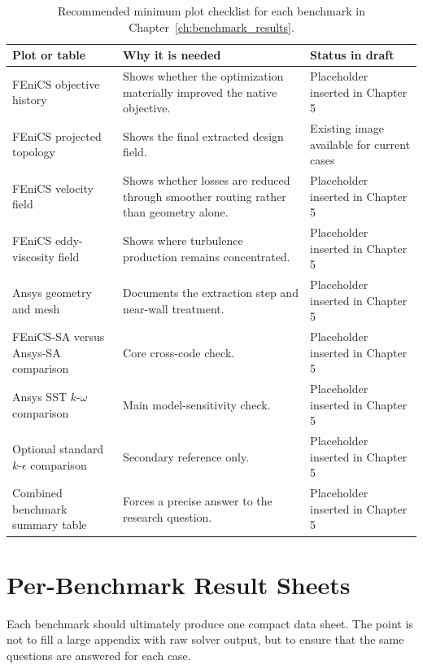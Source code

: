 \begin{table}[htbp]
	\centering
	\footnotesize
	\caption{Recommended minimum plot checklist for each benchmark in Chapter~\ref{ch:benchmark_results}.}
	\label{tab:app_plot_checklist}
	\renewcommand{\arraystretch}{1.2}
	\begin{tabularx}{\textwidth}{l X X}
		\hline
		\textbf{Plot or table} & \textbf{Why it is needed} & \textbf{Status in draft} \\
		\hline
		FEniCS objective history & Shows whether the optimization materially improved the native objective. & Placeholder inserted in Chapter 5 \\
		FEniCS projected topology & Shows the final extracted design field. & Existing image available for current cases \\
		FEniCS velocity field & Shows whether losses are reduced through smoother routing rather than geometry alone. & Placeholder inserted in Chapter 5 \\
		FEniCS eddy-viscosity field & Shows where turbulence production remains concentrated. & Placeholder inserted in Chapter 5 \\
		Ansys geometry and mesh & Documents the extraction step and near-wall treatment. & Placeholder inserted in Chapter 5 \\
		FEniCS-SA versus Ansys-SA comparison & Core cross-code check. & Placeholder inserted in Chapter 5 \\
		Ansys SST $k$-$\omega$ comparison & Main model-sensitivity check. & Placeholder inserted in Chapter 5 \\
		Optional standard $k$-$\epsilon$ comparison & Secondary reference only. & Placeholder inserted in Chapter 5 \\
		Combined benchmark summary table & Forces a precise answer to the research question. & Placeholder inserted in Chapter 5 \\
		\hline
	\end{tabularx}
\end{table}

\section{Per-Benchmark Result Sheets}
Each benchmark should ultimately produce one compact data sheet. The point is not to fill a large appendix with raw solver output, but to ensure that the same questions are answered for each case.

